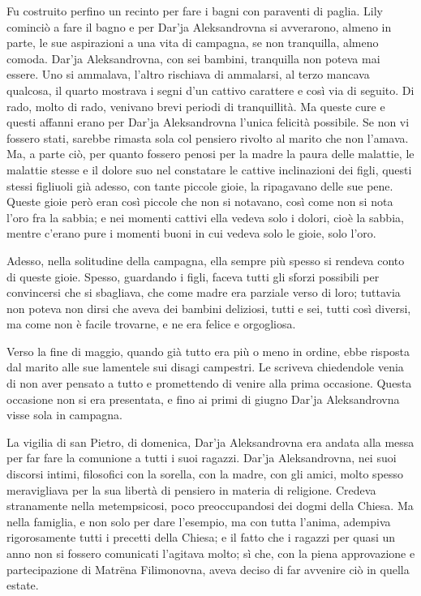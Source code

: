 Fu costruito perfino un recinto per fare i bagni con paraventi di paglia. Lily cominciò a fare il bagno e per Dar'ja Aleksandrovna si avverarono, almeno in parte, le sue aspirazioni a una vita di campagna, se non tranquilla, almeno comoda. Dar'ja Aleksandrovna, con sei bambini, tranquilla non poteva mai essere. Uno si ammalava, l'altro rischiava di ammalarsi, al terzo mancava qualcosa, il quarto mostrava i segni d'un cattivo carattere e così via di seguito. Di rado, molto di rado, venivano brevi periodi di tranquillità. Ma queste cure e questi affanni erano per Dar'ja Aleksandrovna l'unica felicità possibile. Se non vi fossero stati, sarebbe rimasta sola col pensiero rivolto al marito che non l'amava. Ma, a parte ciò, per quanto fossero penosi per la madre la paura delle malattie, le malattie stesse e il dolore suo nel constatare le cattive inclinazioni dei figli, questi stessi figliuoli già adesso, con tante piccole gioie, la ripagavano delle sue pene. Queste gioie però eran così piccole che non si notavano, così come non si nota l'oro fra la sabbia; e nei momenti cattivi ella vedeva solo i dolori, cioè la sabbia, mentre c'erano pure i momenti buoni in cui vedeva solo le gioie, solo l'oro. 

Adesso, nella solitudine della campagna, ella sempre più spesso si rendeva conto di queste gioie. Spesso, guardando i figli, faceva tutti gli sforzi possibili per convincersi che si sbagliava, che come madre era parziale verso di loro; tuttavia non poteva non dirsi che aveva dei bambini deliziosi, tutti e sei, tutti così diversi, ma come non è facile trovarne, e ne era felice e orgogliosa. 

\label{viii-2} 

Verso la fine di maggio, quando già tutto era più o meno in ordine, ebbe risposta dal marito alle sue lamentele sui disagi campestri. Le scriveva chiedendole venia di non aver pensato a tutto e promettendo di venire alla prima occasione. Questa occasione non si era presentata, e fino ai primi di giugno Dar'ja Aleksandrovna visse sola in campagna. 

La vigilia di san Pietro, di domenica, Dar'ja Aleksandrovna era andata alla messa per far fare la comunione a tutti i suoi ragazzi. Dar'ja Aleksandrovna, nei suoi discorsi intimi, filosofici con la sorella, con la madre, con gli amici, molto spesso meravigliava per la sua libertà di pensiero in materia di religione. Credeva stranamente nella metempsicosi, poco preoccupandosi dei dogmi della Chiesa. Ma nella famiglia, e non solo per dare l'esempio, ma con tutta l'anima, adempiva rigorosamente tutti i precetti della Chiesa; e il fatto che i ragazzi per quasi un anno non si fossero comunicati l'agitava molto; sì che, con la piena approvazione e partecipazione di Matrëna Filimonovna, aveva deciso di far avvenire ciò in quella estate. 

